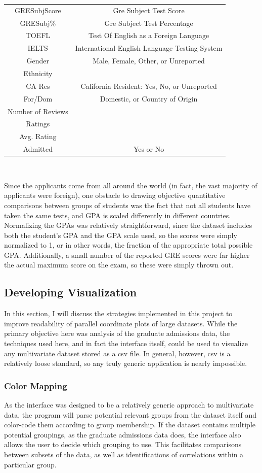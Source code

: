 \documentclass[]{article}
\begin{document}
\begin{tabular}{c|c}
		 GRESubjScore & Gre Subject Test Score\\
		 GRESubj\% & Gre Subject Test Percentage\\
		 TOEFL & Test Of English as a Foreign Language\\
		 IELTS & International English Language Testing System \\
		 Gender & Male, Female, Other, or Unreported\\
		 Ethnicity & \\
		 CA Res & California Resident: Yes, No, or Unreported\\
		 For/Dom & Domestic, or Country of Origin\\
		 Number of Reviews & \\ 
		 Ratings & \\ 
		 Avg. Rating & \\ 
		 Admitted & Yes or No\\
		\end{tabular} \\
		
		\par Since the applicants come from all around the world (in fact, the vast majority of applicants were foreign), one obstacle to drawing objective quantitative comparisons between groups of students was the fact that not all students have taken the same tests, and GPA is scaled differently in different countries. Normalizing the GPAs was relatively straightforward, since the dataset includes both the student's GPA and the GPA scale used, so the scores were simply normalized to 1, or in other words, the fraction of the appropriate total possible GPA. Additionally, a small number of the reported GRE scores were far higher the actual maximum score on the exam\cite{GRE}, so these were simply thrown out.
	\subsection{Developing Visualization}
		\par In this section, I will discuss the strategies implemented in this project to improve readability of parallel coordinate plots of large datasets. While the primary objective here was analysis of the graduate admissions data, the techniques used here, and in fact the interface itself, could be used to visualize any multivariate dataset stored as a csv file. In general, however, csv is a relatively loose standard\cite{csv}, so any truly generic application is nearly impossible.
		\subsubsection{Color Mapping}
			As the interface was designed to be a relatively generic approach to multivariate data, the program will parse potential relevant groups from the dataset itself and color-code them according to group membership. If the dataset contains multiple potential groupings, as the graduate admissions data does, the interface also allows the user to decide which grouping to use. This facilitates comparisons between subsets of the data, as well as identifications of correlations within a particular group.
\end{document}
